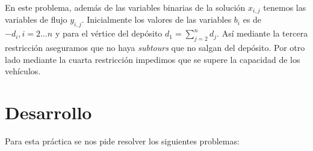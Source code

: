 \documentclass[a4paper,11pt]{article}
\begin{document}
\begin{enumerate}
En este problema, además de las variables binarias de la solución ${x_{i,j}}$ tenemos las variables de flujo ${y_{i,j}}$. Inicialmente los valores de las variables ${b_{i}}$ es de ${-d_{i}, i=2 \ldots n}$ y para el vértice del depósito ${d_{1} = \sum_{j=2}^{n}{d_{j}}}$. Así mediante la tercera restricción aseguramos que no haya \textit{subtours} que no salgan del depósito. Por otro lado mediante la cuarta restricción impedimos que se supere la capacidad de los vehículos.
\end{enumerate}

\newpage
\section{Desarrollo}
Para esta práctica se nos pide resolver los siguientes problemas:
\end{document}
